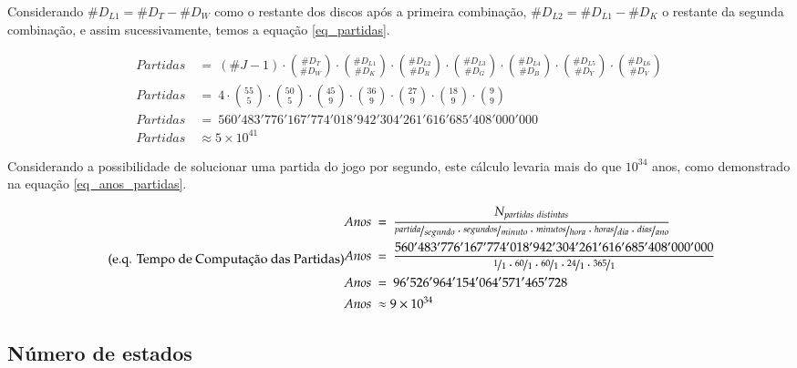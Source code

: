 Considerando $\#D_{L1} = \#D_T - \#D_W$ como o restante dos discos após a primeira combinação, $\#D_{L2} = \#D_{L1} - \#D_K$ o restante da segunda combinação, e assim sucessivamente, temos a equação \ref{eq_partidas}.

 \begin{equation}
	 \label{eq_partidas}
	 \tag{e.q. Números de Partidas Distintas}
 \begin{split}
 Partidas\ &=\  (\#J-1) \cdot \binom{\#D_T}{\#D_W} \cdot \binom{\#D_{L1}}{\#D_K} \cdot \binom{\#D_{L2}}{\#D_R} \cdot \binom{\#D_{L3}}{\#D_G} \cdot \binom{\#D_{L4}}{\#D_B} \cdot \binom{\#D_{L5}}{\#D_Y} \cdot \binom{\#D_{L6}}{\#D_V}\\
 Partidas\ &=\  4\cdot \binom{55}{5} \cdot \binom{50}{5} \cdot \binom{45}{9} \cdot \binom{36}{9} \cdot \binom{27}{9} \cdot \binom{18}{9} \cdot \binom{9}{9}\\
 Partidas\ &=\ 560'483'776'167'774'018'942'304'261'616'685'408'000'000\\
 Partidas\ &\approx 5\times 10^{41}
 \end{split}
 \end{equation}

Considerando a possibilidade de solucionar uma partida do jogo por segundo, este cálculo levaria mais do que $10^{34}$ anos, como demonstrado na equação \ref{eq_anos_partidas}.

 \begin{equation} \label{eq_anos_partidas} \tag{e.q. Tempo de Computação das Partidas}
 \begin{split}
 Anos\ &=\ \dfrac{N_{partidas\ distintas}}{\nicefrac{partida}{segundo}\cdot\nicefrac{segundos}{minuto}\cdot\nicefrac{minutos}{hora}\cdot\nicefrac{horas}{dia}\cdot\nicefrac{dias}{ano}}\\
 Anos\ &=\ \dfrac{560'483'776'167'774'018'942'304'261'616'685'408'000'000}{\nicefrac{1}{1}\cdot\nicefrac{60}{1}\cdot\nicefrac{60}{1}\cdot\nicefrac{24}{1}\cdot\nicefrac{365}{1}}\\
 Anos\ &=\ 96'526'964'154'064'571'465'728\\
 Anos\ &\approx 9\times 10^{34}
 \end{split}
 \end{equation}

\subsection{Número de estados}

